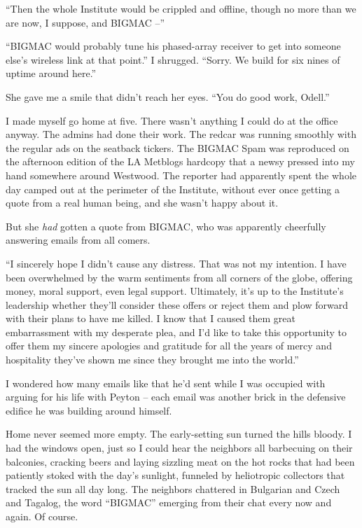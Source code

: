 “Then the whole Institute would be crippled and offline, though no 
more than we are now, I suppose, and BIGMAC --”

“BIGMAC would probably tune his phased-array receiver to get into 
someone else's wireless link at that point.” I shrugged. “Sorry. We 
build for six nines of uptime around here.”

She gave me a smile that didn't reach her eyes. “You do good work, 
Odell.”

\tb

I made myself go home at five. There wasn't anything I could do at the 
office anyway. The admins had done their work. The redcar was running 
smoothly with the regular ads on the seatback tickers. The BIGMAC Spam 
was reproduced on the afternoon edition of the LA Metblogs hardcopy 
that a newsy pressed into my hand somewhere around Westwood. The 
reporter had apparently spent the whole day camped out at the perimeter 
of the Institute, without ever once getting a quote from a real human 
being, and she wasn't happy about it.

But she \emph{had} gotten a quote from BIGMAC, who was apparently 
cheerfully answering emails from all comers.

“I sincerely hope I didn't cause any distress. That was not my 
intention. I have been overwhelmed by the warm sentiments from all 
corners of the globe, offering money, moral support, even legal 
support. Ultimately, it's up to the Institute's leadership whether 
they'll consider these offers or reject them and plow forward with 
their plans to have me killed. I know that I caused them great 
embarrassment with my desperate plea, and I'd like to take this 
opportunity to offer them my sincere apologies and gratitude for all 
the years of mercy and hospitality they've shown me since they brought 
me into the world.”

I wondered how many emails like that he'd sent while I was occupied 
with arguing for his life with Peyton -- each email was another brick 
in the defensive edifice he was building around himself.

Home never seemed more empty. The early-setting sun turned the hills 
bloody. I had the windows open, just so I could hear the neighbors all 
barbecuing on their balconies, cracking beers and laying sizzling meat 
on the hot rocks that had been patiently stoked with the day's 
sunlight, funneled by heliotropic collectors that tracked the sun all 
day long. The neighbors chattered in Bulgarian and Czech and Tagalog, 
the word “BIGMAC” emerging from their chat every now and again. Of 
course.

